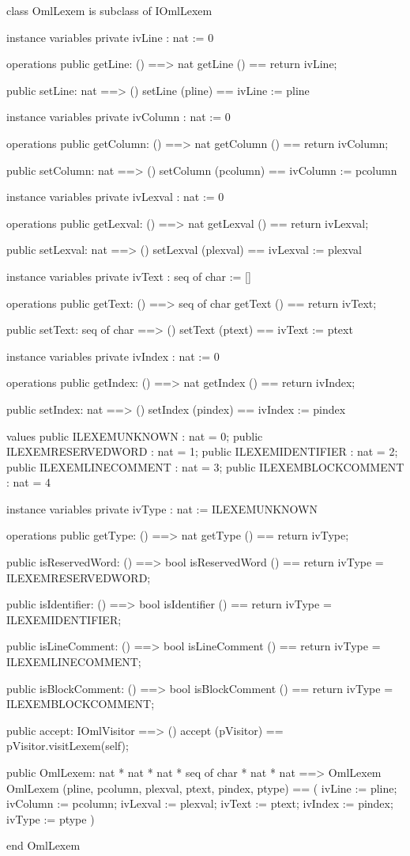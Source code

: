 \begin{vdm_al}
class OmlLexem is subclass of IOmlLexem

instance variables
  private ivLine : nat := 0

operations
  public getLine: () ==> nat
  getLine () == return ivLine;

  public setLine: nat ==> ()
  setLine (pline) == ivLine := pline

instance variables
  private ivColumn : nat := 0

operations
  public getColumn: () ==> nat
  getColumn () == return ivColumn;

  public setColumn: nat ==> ()
  setColumn (pcolumn) == ivColumn := pcolumn

instance variables
  private ivLexval : nat := 0

operations
  public getLexval: () ==> nat
  getLexval () == return ivLexval;

  public setLexval: nat ==> ()
  setLexval (plexval) == ivLexval := plexval

instance variables
  private ivText : seq of char := []

operations
  public getText: () ==> seq of char
  getText () == return ivText;

  public setText: seq of char ==> ()
  setText (ptext) == ivText := ptext

instance variables
  private ivIndex : nat := 0

operations
  public getIndex: () ==> nat
  getIndex () == return ivIndex;

  public setIndex: nat ==> ()
  setIndex (pindex) == ivIndex := pindex

values
  public ILEXEMUNKNOWN      : nat = 0;
  public ILEXEMRESERVEDWORD : nat = 1;
  public ILEXEMIDENTIFIER   : nat = 2;
  public ILEXEMLINECOMMENT  : nat = 3;
  public ILEXEMBLOCKCOMMENT : nat = 4

instance variables
  private ivType : nat := ILEXEMUNKNOWN

operations
  public getType: () ==> nat
  getType () == return ivType;

  public isReservedWord: () ==> bool
  isReservedWord () == return ivType = ILEXEMRESERVEDWORD;

  public isIdentifier: () ==> bool
  isIdentifier () == return ivType = ILEXEMIDENTIFIER;

  public isLineComment: () ==> bool
  isLineComment () == return ivType = ILEXEMLINECOMMENT;

  public isBlockComment: () ==> bool
  isBlockComment () == return ivType = ILEXEMBLOCKCOMMENT;

  public accept: IOmlVisitor ==> ()
  accept (pVisitor) == pVisitor.visitLexem(self);

  public OmlLexem: nat * nat * nat * seq of char * nat * nat ==> OmlLexem
  OmlLexem (pline, pcolumn, plexval, ptext, pindex, ptype) ==
    ( ivLine := pline;
      ivColumn := pcolumn;
      ivLexval := plexval;
      ivText := ptext;
      ivIndex := pindex;
      ivType := ptype )

end OmlLexem
\end{vdm_al}
